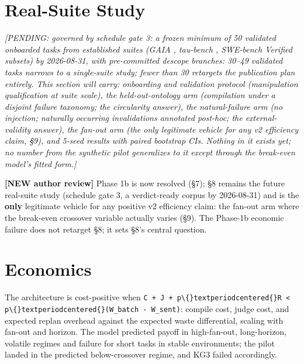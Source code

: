 \documentclass[acmsmall,screen,review,anonymous]{acmart}
\begin{document}
\section{Real-Suite Study}
\emph{[PENDING: governed by schedule gate 3: a frozen minimum of 50 validated onboarded tasks from established suites (GAIA \cite{ref31}, tau-bench \cite{ref32}, SWE-bench Verified subsets) by 2026-08-31, with pre-committed descope branches: 30--49 validated tasks narrows to a single-suite study; fewer than 30 retargets the publication plan entirely. This section will carry: onboarding and validation protocol (manipulation qualification at suite scale), the held-out-ontology arm (compilation under a disjoint failure taxonomy; the circularity answer), the natural-failure arm (no injection; naturally occurring invalidations annotated post-hoc; the external-validity answer), the fan-out arm (the only legitimate vehicle for any v2 efficiency claim, \S9), and 5-seed results with paired bootstrap CIs. Nothing in it exists yet; no number from the synthetic pilot generalizes to it except through the break-even model's fitted form.]}

\textbf{[NEW \textperiodcentered{} author review]} Phase 1b is now resolved (\S7); \S8 remains the future real-suite study (schedule gate 3, a verdict-ready corpus by 2026-08-31) and is the \textbf{only} legitimate vehicle for any positive v2 efficiency claim: the fan-out arm where the break-even crossover variable actually varies (\S9). The Phase-1b economic failure does not retarget \S8; it sets \S8's central question.

\section{Economics}
The architecture is cost-positive when \texttt{C + J + p\textbackslash\{\}textperiodcentered\{\}R < p\textbackslash\{\}textperiodcentered\{\}(W\_batch - W\_sent)}: compile cost, judge cost, and expected replan overhead against the expected waste differential, scaling with fan-out and horizon. The model predicted payoff in high-fan-out, long-horizon, volatile regimes and failure for short tasks in stable environments; the pilot landed in the predicted below-crossover regime, and KG3 failed accordingly.
\end{document}
